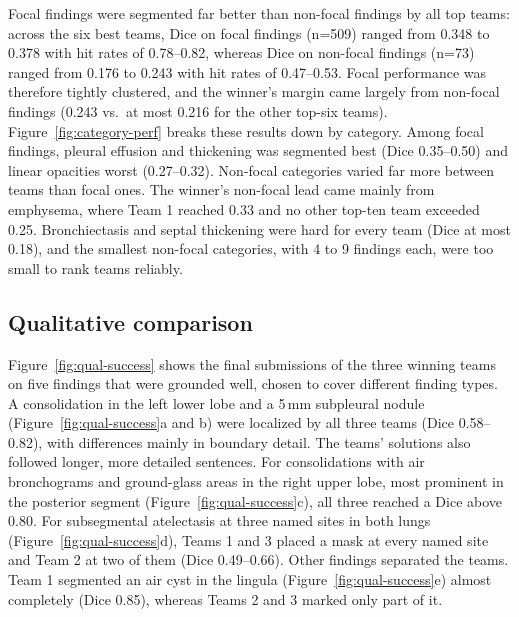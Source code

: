 \documentclass[final,5p,times,twocolumn,authoryear,numafflabel]{elsarticle}
\begin{document}
Focal findings were segmented far better than non-focal findings by all
top teams: across the six best teams, Dice on focal findings (n=509) ranged from
0.348 to 0.378 with hit rates of 0.78--0.82, whereas Dice on non-focal
findings (n=73) ranged from 0.176 to 0.243 with hit rates of
0.47--0.53. Focal performance was therefore tightly clustered, and the winner's
margin came largely from non-focal findings (0.243 vs.\ at most 0.216 for the
other top-six teams).
Figure~\ref{fig:category-perf} breaks these results down by category. Among
focal findings, pleural effusion and thickening was segmented best (Dice
0.35--0.50) and linear opacities worst (0.27--0.32). Non-focal categories varied far
more between teams than focal ones. The winner's non-focal lead came mainly from emphysema,
where Team 1 reached 0.33 and no other top-ten team exceeded
0.25. Bronchiectasis and septal thickening were hard for every team (Dice at most
0.18), and the smallest non-focal
categories, with 4 to 9 findings each, were too small to rank teams
reliably.

\subsection{Qualitative comparison}
\label{sec:qualitative}
Figure~\ref{fig:qual-success} shows the final submissions of the three
winning teams on five findings that were grounded well, chosen to cover
different finding types. A
consolidation in the left lower lobe and a 5\,mm subpleural nodule (Figure~\ref{fig:qual-success}a and b) were localized by all three teams (Dice 0.58--0.82), with differences mainly in
boundary detail. The teams' solutions also followed longer, more detailed sentences. For
consolidations with air bronchograms and ground-glass areas in the right upper
lobe, most prominent in the posterior segment (Figure~\ref{fig:qual-success}c), all three reached a Dice above
0.80. For subsegmental atelectasis at three named sites in both lungs (Figure~\ref{fig:qual-success}d),
Teams 1 and 3 placed a mask at every named site and Team 2 at two of them (Dice
0.49--0.66). Other findings separated the teams. Team 1 segmented an
air cyst in the lingula (Figure~\ref{fig:qual-success}e) almost completely (Dice 0.85), whereas Teams 2 and
3 marked only part of it.
\end{document}
